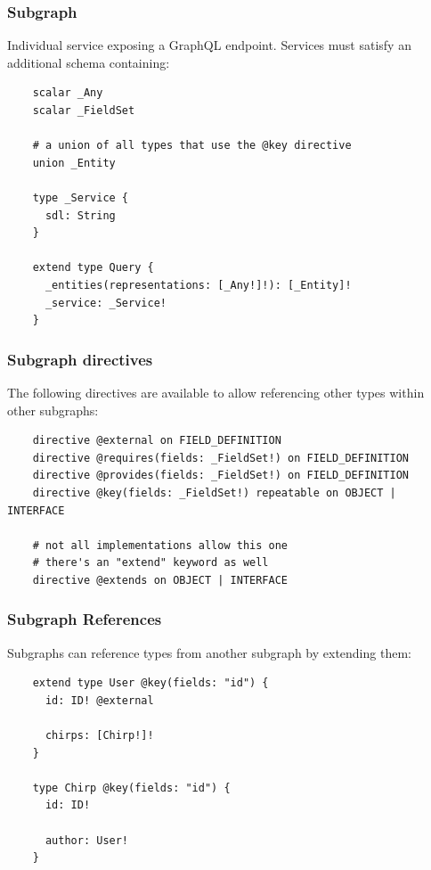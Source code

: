 \documentclass{beamer}
\begin{document}
\begin{frame}[fragile]
  \frametitle{Subgraph}
  Individual service exposing a GraphQL endpoint. Services must satisfy an additional schema containing:

  \begin{verbatim}
    scalar _Any
    scalar _FieldSet
    
    # a union of all types that use the @key directive
    union _Entity
    
    type _Service {
      sdl: String
    }
    
    extend type Query {
      _entities(representations: [_Any!]!): [_Entity]!
      _service: _Service!
    }
  \end{verbatim}
\end{frame}


\begin{frame}[fragile]
  \frametitle{Subgraph directives}
  The following directives are available to allow referencing other types within other subgraphs:

  \begin{verbatim}
    directive @external on FIELD_DEFINITION
    directive @requires(fields: _FieldSet!) on FIELD_DEFINITION
    directive @provides(fields: _FieldSet!) on FIELD_DEFINITION
    directive @key(fields: _FieldSet!) repeatable on OBJECT | INTERFACE
    
    # not all implementations allow this one
    # there's an "extend" keyword as well
    directive @extends on OBJECT | INTERFACE
  \end{verbatim}
\end{frame}


\begin{frame}[fragile]
  \frametitle{Subgraph References}
  Subgraphs can reference types from another subgraph by extending them:

  \begin{verbatim}
    extend type User @key(fields: "id") {
      id: ID! @external

      chirps: [Chirp!]!
    }

    type Chirp @key(fields: "id") {
      id: ID!

      author: User!
    }
  \end{verbatim}
\end{frame}
\end{document}
